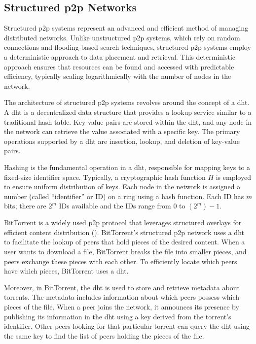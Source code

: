 \subsection{Structured \gls{p2p} Networks}
Structured \gls{p2p} systems represent an advanced and efficient method of managing distributed networks.
Unlike unstructured \gls{p2p} systems, which rely on random connections and flooding-based search techniques, structured \gls{p2p} systems employ a deterministic approach to data placement and retrieval.
This deterministic approach ensures that resources can be found and accessed with predictable efficiency, typically scaling logarithmically with the number of nodes in the network.

The architecture of structured \gls{p2p} systems revolves around the concept of a \gls{dht}.
A \gls{dht} is a decentralized data structure that provides a lookup service similar to a traditional hash table.
Key-value pairs are stored within the \gls{dht}, and any node in the network can retrieve the value associated with a specific key.
The primary operations supported by a \gls{dht} are insertion, lookup, and deletion of key-value pairs.

Hashing is the fundamental operation in a \gls{dht}, responsible for mapping keys to a fixed-size identifier space.
Typically, a cryptographic hash function $H$ is employed to ensure uniform distribution of keys.
Each node in the network is assigned a number (called ``identifier'' or ID) on a ring using a hash function.
Each ID has $m$ bits; there are $2^m$ IDs available and the IDs range from 0 to $(2^m) -1$.

BitTorrent is a widely used \gls{p2p} protocol that leverages structured overlays for efficient content distribution (\cite{BitTorrent2005}).
BitTorrent's structured \gls{p2p} network uses a \gls{dht} to facilitate the lookup of peers that hold pieces of the desired content.
When a user wants to download a file, BitTorrent breaks the file into smaller pieces, and peers exchange these pieces with each other.
To efficiently locate which peers have which pieces, BitTorrent uses a \gls{dht}.

Moreover, in BitTorrent, the \gls{dht} is used to store and retrieve metadata about torrents.
The metadata includes information about which peers possess which pieces of the file.
When a peer joins the network, it announces its presence by publishing its information in the \gls{dht} using a key derived from the torrent's identifier.
Other peers looking for that particular torrent can query the \gls{dht} using the same key to find the list of peers holding the pieces of the file.

